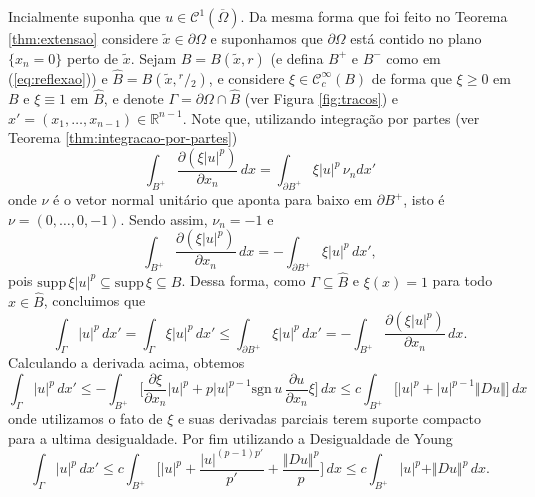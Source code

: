 \documentclass[a4paper, 11pt]{book}
\theoremstyle{definition}
\newcommand{\bR}{\mathbb{R}}
\newcommand{\cC}{\mathcal{C}}
\newcommand{\supp}{\mathrm{supp}\,}
\newcommand{\sgn}{\mathrm{sgn}}
\newcommand{\sfrac}[2]{{}^{#1}\!\!/\!_{#2}}
\begin{document}
\begin{prf}
    Incialmente suponha que $u \in \cC^1(\overline{\Omega})$. Da mesma forma que foi feito no Teorema \ref{thm:extensao} considere $\tilde x \in \partial\Omega$ e suponhamos que $\partial\Omega$ está contido no plano $\{x_n = 0\}$ perto de $\tilde x$.
    Sejam $B = B(\tilde x, r)$ (e defina $B^+$ e $B^-$ como em (\ref{eq:reflexao})) e $\widehat B = B(\tilde x, \sfrac{r}{2})$,
    e considere $\xi \in \cC^{\infty}_c(B)$ de forma que $\xi \geqslant 0$ em $B$ e $\xi \equiv 1$ em $\widehat B$, e denote $\Gamma = \partial \Omega \cap \widehat B$ (ver Figura \ref{fig:tracos}) e $x' = (x_1,\dots,x_{n-1}) \in \bR^{n-1}$.
    Note que, utilizando integração por partes (ver Teorema \ref{thm:integracao-por-partes})
    \[
        \int_{B^+} \dfrac{\partial (\xi |u|^p)}{\partial x_n}\,dx = \int_{\partial B^+} \xi |u|^p \, \nu_n dx'
    \]
    onde $\nu$ é o vetor normal unitário que aponta para baixo em $\partial B^+$, isto é $\nu =  (0,\dots,0,-1)$. Sendo assim, $\nu_n = -1$ e 
    \[
        \int_{B^+} \dfrac{\partial (\xi |u|^p)}{\partial x_n} \,dx = -\int_{\partial B^+} \xi |u|^p \,dx',
    \]
    pois $\supp \xi |u|^p \subseteq \supp \xi  \subseteq B$.
    Dessa forma, como $\Gamma \subseteq \hat B$ e $\xi(x) = 1$ para todo $x \in \hat B$, concluimos que
    \[
        \int_{\Gamma} |u|^p \,dx' = \int_{\Gamma} \xi|u|^p \,dx' \leqslant \int_{\partial B^+} \xi|u|^p \,dx' = -\int_{B^+} \dfrac{\partial (\xi |u|^p)}{\partial x_n} \,dx.
    \]
    Calculando a derivada acima, obtemos
    \[
        \int_\Gamma |u|^p \,dx' \leqslant - \int_{B^+} \Big[ \dfrac{\partial \xi}{\partial x_n} |u|^p + p|u|^{p-1} \sgn\,u\,\dfrac{\partial u}{\partial x_n} \xi \Big] \,dx \leqslant c \int_{B^+} \Big[ |u|^p + |u|^{p-1} \Vert Du \Vert \Big] \,dx
    \]
    onde utilizamos o fato de $\xi$ e suas derivadas parciais terem suporte compacto para a ultima desigualdade. Por fim utilizando a Desigualdade de Young
    \begin{equation} \label{eq:umaisdu}
        \int_\Gamma |u|^p \,dx' \leqslant c \int_{B^+} \bigg[ |u|^p + \frac{|u|^{(p-1)p'}}{p'} + \frac{\Vert Du \Vert^p}{p} \bigg] \,dx \leqslant c \int_{B^+} |u|^p + \Vert Du \Vert^p \,dx.
    \end{equation}

    \begin{figure}
        \centering
\end{figure}
\end{prf}
\end{document}
